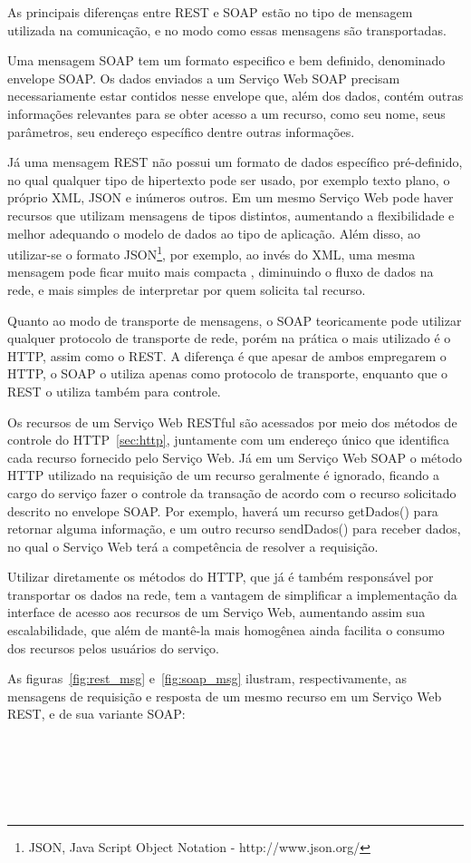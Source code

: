 As principais diferenças entre REST e SOAP estão no tipo de mensagem utilizada na comunicação, e no modo como essas mensagens são transportadas.
\par
Uma mensagem SOAP tem um formato especifico e bem definido, denominado envelope SOAP. Os dados enviados a um Serviço Web SOAP precisam necessariamente estar contidos nesse envelope que, além dos dados, contém outras informações relevantes para se obter acesso a um recurso, como seu nome, seus parâmetros, seu endereço específico dentre outras informações. 
\par
 Já uma mensagem REST não possui um formato de dados específico pré-definido, no qual qualquer tipo de hipertexto pode ser usado, por exemplo texto plano, o próprio XML, JSON e inúmeros outros. Em um mesmo Serviço Web pode haver recursos que utilizam mensagens de tipos distintos, aumentando a flexibilidade e melhor adequando o modelo de dados ao tipo de aplicação. Além disso, ao utilizar-se o formato JSON\footnote{JSON, Java Script Object Notation - http://www.json.org/}, por exemplo, ao invés do XML, uma mesma mensagem pode ficar muito mais compacta , diminuindo o fluxo de dados na rede, e mais simples de interpretar por quem solicita tal recurso.
\par
Quanto ao modo de transporte de mensagens, o SOAP teoricamente pode utilizar qualquer protocolo de transporte de rede, porém na prática o mais utilizado é o HTTP, assim como o REST. A diferença é que apesar de ambos empregarem o HTTP, o SOAP o utiliza apenas como protocolo de transporte, enquanto que o REST o utiliza também para controle.
\par 
 Os recursos de um Serviço Web RESTful são acessados por meio dos métodos de controle do HTTP~\ref{sec:http}, juntamente com um endereço único que identifica cada recurso fornecido pelo Serviço Web. Já em um Serviço Web SOAP o método HTTP utilizado na requisição de um recurso geralmente é ignorado, ficando a cargo do serviço fazer o controle da transação de acordo com o recurso solicitado descrito no envelope SOAP. Por exemplo, haverá um recurso getDados() para retornar alguma informação, e um outro recurso sendDados() para receber dados, no qual o Serviço Web terá a competência de resolver a requisição.
\par
 Utilizar diretamente os métodos do HTTP, que já é também responsável por transportar os dados na rede, tem a vantagem de simplificar a implementação da interface de acesso aos recursos de um Serviço Web, aumentando assim sua escalabilidade, que além de mantê-la mais homogênea ainda facilita o consumo dos recursos pelos usuários do serviço.
\par As figuras~\ref{fig:rest_msg} e~\ref{fig:soap_msg} ilustram, respectivamente, as mensagens de requisição e resposta de um mesmo recurso em um Serviço Web REST, e de sua variante SOAP:
\\\\\\\\\\\\
 
